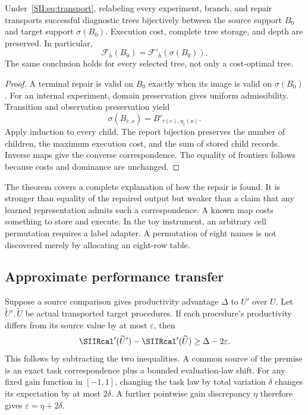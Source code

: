 \begin{SIItheorem}\label{SII:thm:transport}
Under~\eqref{SII:eq:transport}, relabeling every experiment, branch, and repair transports successful diagnostic trees bijectively between the source support $B_0$ and target support $\sigma(B_0)$. Execution cost, complete tree storage, and depth are preserved. In particular,
\[
\mathcal F_h(B_0)=\mathcal F'_h(\sigma(B_0)).
\]
The same conclusion holds for every selected tree, not only a cost-optimal tree.
\end{SIItheorem}
\begin{proof}
A terminal repair is valid on $B_0$ exactly when its image is valid on $\sigma(B_0)$. For an internal experiment, domain preservation gives uniform admissibility. Transition and observation preservation yield
\[
\sigma(B_{e,o})=B'_{\tau(e),\eta_e(o)}.
\]
Apply induction to every child. The report bijection preserves the number of children, the maximum execution cost, and the sum of stored child records. Inverse maps give the converse correspondence. The equality of frontiers follows because costs and dominance are unchanged.
\end{proof}

The theorem covers a complete explanation of how the repair is found. It is stronger than equality of the repaired output but weaker than a claim that any learned representation admits such a correspondence. A known map costs something to store and execute. In the toy instrument, an arbitrary cell permutation requires a label adapter. A permutation of eight names is not discovered merely by allocating an eight-row table.

\subsection{Approximate performance transfer}
Suppose a source comparison gives productivity advantage $\Delta$ to $U'$ over $U$. Let $\widetilde U',\widetilde U$ be actual transported target procedures. If each procedure's productivity differs from its source value by at most $\varepsilon$, then
\begin{equation}\label{SII:eq:gaintransport}
\SIIRcal'(\widetilde U')-\SIIRcal'(\widetilde U)
\geq\Delta-2\varepsilon.
\end{equation}
This follows by subtracting the two inequalities. A common source of the premise is an exact task correspondence plus a bounded evaluation-law shift. For any fixed gain function in $[-1,1]$, changing the task law by total variation $\delta$ changes its expectation by at most $2\delta$. A further pointwise gain discrepancy $\eta$ therefore gives $\varepsilon=\eta+2\delta$.

